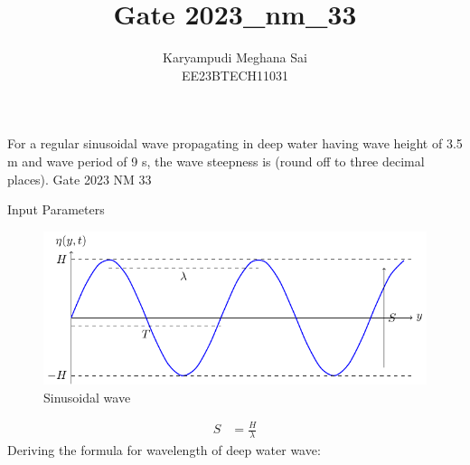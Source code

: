 \documentclass[journal,12pt,onecolumn]{IEEEtran}
\theoremstyle{remark}
\begin{document}
\let\vec\mathbf







\bigskip


\title{Gate 2023\_nm\_33}
\author{Karyampudi Meghana Sai\\ EE23BTECH11031}

\maketitle

For a regular sinusoidal wave propagating in deep water having wave height of 3.5 m and wave period of 9 s, the wave steepness is \underline{\hspace{1cm}} (round off to three decimal places).
\hfill Gate 2023 NM 33

\solution

\begin{table}[h]
 	\centering
 	\resizebox{6 cm}{!}{
 		
 	}
 	\vspace{6 pt}
 	\caption{Input Parameters}
 	\label{} 
 \end{table} 
 
 \begin{figure}[h]
    \centering
    \includegraphics[width=\columnwidth]{figs/figs1.pdf}
    \caption{Sinusoidal wave}
    \label{fig:}
\end{figure} 

\begin{align}
S&=\frac{H}{\lambda} \label{eq:gatenm33eq1}
\end{align}
 Deriving the formula for wavelength of deep water wave:\\
\end{document}
